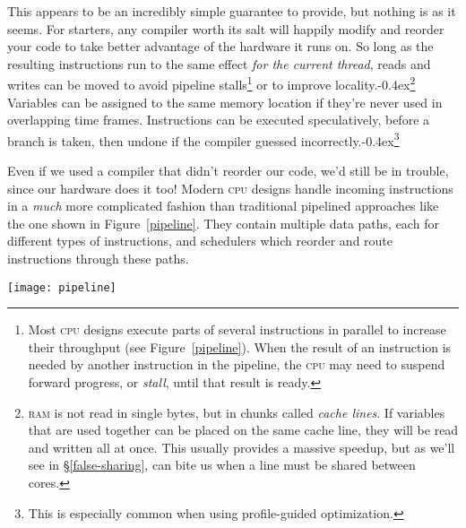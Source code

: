 \documentclass[fontsize=\bodyfontsize, numbers=endperiod]{scrartcl}
\newcommand{\punckern}{\kern-0.4ex}
\newcommand{\cpp}[1]{C\kern-0.1ex\raisebox{0.15ex}{\texttt{++}}{\addfontfeature{Numbers=LowercaseOff}#1}}
\newcommand{\fig}[1]{Figure~\ref{#1}}
\newcommand{\introduce}[1]{\textit{#1}}
\newcommand{\secref}[1]{\hyperref[#1]{\textsc{\S}\ref*{#1}}}
\newenvironment{colfigure}
  {\par\vspace{1\baselineskip minus 0.5\baselineskip}\noindent\minipage{\linewidth}}
  {\endminipage\vspace{1\baselineskip minus 0.7\baselineskip}}
\begin{document}
\begin{multicols}{2}
This appears to be an incredibly simple guarantee to provide,
but nothing is as it seems.
For starters, any compiler worth its salt will
happily modify and reorder your code to take better advantage of the hardware
it runs on.
So long as the resulting instructions run to the same effect
\emph{for the current thread},
reads and writes can be moved to avoid pipeline stalls\footnote{%
Most \textsc{cpu} designs execute parts of several instructions in parallel
to increase their throughput (see \fig{pipeline}).
When the result of an instruction is needed by
another instruction in the pipeline, the \textsc{cpu} may need
to suspend forward progress, or \introduce{stall}, until that result is ready.}
or to improve locality.\punckern\footnote{%
\textsc{ram} is not read in single bytes, but in chunks called
\introduce{cache lines}.
If variables that are used together can be placed on the same cache line,
they will be read and written all at once.
This usually provides a massive speedup,
but as we'll see in \secref{false-sharing},
can bite us when a line must be shared between cores.
}
Variables can be assigned to the same memory location if they're never used
in overlapping time frames.
Instructions can be executed speculatively, before a branch is taken,
then undone if the compiler guessed incorrectly.\punckern\footnote{This is
especially common when using profile-guided optimization.}

Even if we used a compiler that didn't reorder our code,
we'd still be in trouble, since our hardware does it too!
Modern \textsc{cpu} designs handle incoming instructions in
a \emph{much} more complicated fashion than traditional pipelined approaches
like the one shown in \fig{pipeline}.
They contain multiple data paths, each for different types of instructions,
and schedulers which reorder and route instructions through these paths.
\begin{colfigure}
\centering
\texttt{[image: pipeline]}
\label{pipeline}
\end{colfigure}


\end{multicols}
\end{document}
